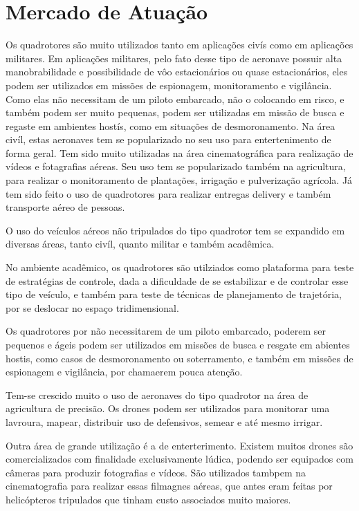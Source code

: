 \section{Mercado de Atuação}

Os quadrotores são muito utilizados tanto em aplicações civís como em aplicações militares. Em aplicações militares, pelo fato desse tipo de aeronave possuir alta manobrabilidade e possibilidade de vôo estacionários ou quase estacionários, eles podem ser utilizados em missões de espionagem, monitoramento e vigilância. Como elas não necessitam de um piloto embarcado, não o colocando em risco, e também podem ser muito pequenas, podem ser utilizadas em missão de busca e regaste em ambientes hostís, como em situações de desmoronamento. Na área civíl, estas aeronaves tem se popularizado no seu uso para entertenimento de forma geral. Tem sido muito utilizadas na área cinematográfica para realização de vídeos e fotagrafias aéreas. Seu uso tem se popularizado também na agricultura, para realizar o monitoramento de plantações, irrigação e pulverização agrícola. Já tem sido feito o uso de quadrotores para realizar entregas delivery e também transporte aéreo de pessoas.

O uso do veículos aéreos não tripulados do tipo quadrotor tem se expandido em diversas áreas, tanto civíl, quanto militar e também acadêmica.

No ambiente acadêmico, os quadrotores são utilziados como plataforma para teste de estratégias de controle, dada a dificuldade de se estabilizar e de controlar esse tipo de veículo, e também para teste de técnicas de planejamento de trajetória, por se deslocar no espaço tridimensional.

Os quadrotores por não necessitarem de um piloto embarcado, poderem ser pequenos e ágeis podem ser utilizados em missões de busca e resgate em abientes hostis, como casos de desmoronamento ou soterramento, e também em missões de espionagem e vigilância, por chamaerem pouca atenção.

Tem-se crescido muito o uso de aeronaves do tipo quadrotor na área de agricultura de precisão. Os drones podem ser utilizados para monitorar uma lavroura, mapear, distribuir uso de defensivos, semear e até mesmo irrigar.

Outra área de grande utilização é a de enterterimento. Existem muitos drones são comercializados com finalidade exclusivamente lúdica, podendo ser equipados com câmeras para produzir fotografias e vídeos. São utilizados tambpem na cinematografia para realizar essas filmagnes aéreas, que antes eram feitas por helicópteros tripulados que tinham custo associados muito maiores.

